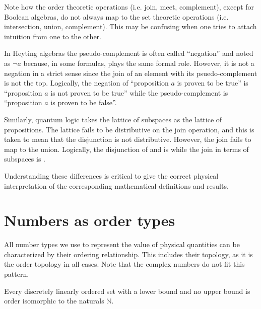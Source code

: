 \documentclass{article}
\begin{document}
\begin{remark}
	Note how the order theoretic operations (i.e. join, meet, complement), except for Boolean algebras, do not always map to the set theoretic operations (i.e. intersection, union, complement). This may be confusing when one tries to attach intuition from one to the other.
	
	In Heyting algebras the pseudo-complement is often called ``negation'' and noted as $\neg a$ because, in some formulas, plays the same formal role. However, it is not a negation in a strict sense since the join of an element with its psuedo-complement is not the top. Logically, the negation of ``proposition $a$ is proven to be true'' is ``proposition $a$ is not proven to be true'' while the pseudo-complement is ``proposition $a$ is proven to be false''.
	
	Similarly, quantum logic takes the lattice of subspaces as the lattice of propositions. The lattice fails to be distributive on the join operation, and this is taken to mean that the disjunction is not distributive. However, the join fails to map to the union. Logically, the disjunction of  and  is  while the join in terms of subspaces is .
	
	Understanding these differences is critical to give the correct physical interpretation of the corresponding mathematical definitions and results.
	
\end{remark}

\section{Numbers as order types}

All number types we use to represent the value of physical quantities can be characterized by their ordering relationship. This includes their topology, as it is the order topology in all cases. Note that the complex numbers do not fit this pattern.

\begin{prop}
	Every discretely linearly ordered set with a lower bound and no upper bound is order isomorphic to the naturals $\mathbb{N}$.
\end{prop}
\end{document}
